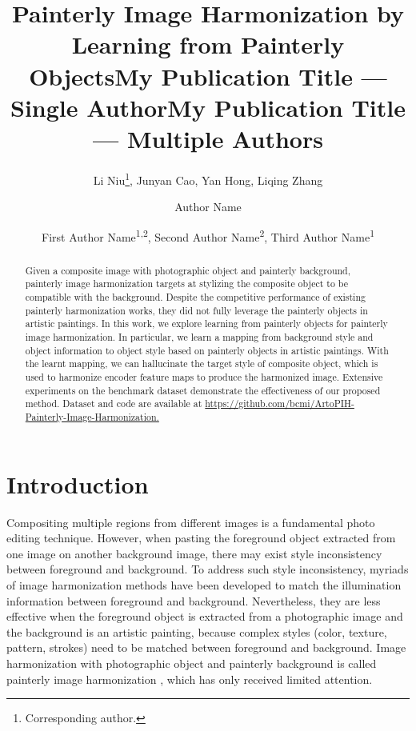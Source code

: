 \documentclass[letterpaper]{article} %
\title{Painterly Image Harmonization by Learning from Painterly Objects}
\author{
Li Niu\thanks{Corresponding author.},
Junyan Cao,
Yan Hong,
Liqing Zhang
\\
}
\title{My Publication Title --- Single Author}
\author {
Author Name
}
\title{My Publication Title --- Multiple Authors}
\author {
First Author Name\textsuperscript{\rm 1,\rm 2},
Second Author Name\textsuperscript{\rm 2},
Third Author Name\textsuperscript{\rm 1}
}
\begin{document}
\maketitle

\begin{abstract}
Given a composite image with photographic object and painterly background, painterly image harmonization targets at stylizing the composite object to be compatible with the background. Despite the competitive performance of existing painterly harmonization works, they did not fully leverage the painterly objects in artistic paintings. In this work, we explore learning from painterly objects for painterly image harmonization. In particular, we learn a mapping from background style and object information to object style based on painterly objects in artistic paintings. With the learnt mapping, we can hallucinate the target style of composite object, which is used to harmonize encoder feature maps to produce the harmonized image. Extensive experiments on the benchmark dataset demonstrate the effectiveness of our proposed method. Dataset and code are available at \url{https://github.com/bcmi/ArtoPIH-Painterly-Image-Harmonization.}
\end{abstract}

\section{Introduction}


Compositing multiple regions from different images is a fundamental photo editing technique. However, when pasting the foreground object extracted from one image on another background image, there may exist style inconsistency between foreground and background. To address such style inconsistency, myriads of image harmonization methods \cite{tsai2017deep,cong2020dovenet,ling2021region} have been developed to match the illumination information between foreground and background.
Nevertheless, they are less effective when the foreground object is extracted from a photographic image and the background is an artistic painting, because complex styles (color, texture, pattern, strokes) need to be matched between foreground and background.
Image harmonization with photographic object and painterly background is called painterly image harmonization \cite{luan2018deep}, which has only received limited attention.
\end{document}
